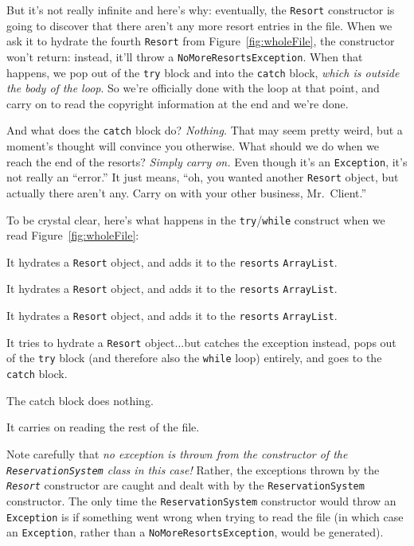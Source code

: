 But it's not really infinite and here's why: eventually, the \texttt{Resort}
constructor is going to discover that there aren't any more resort entries in
the file. When we ask it to hydrate the fourth \texttt{Resort} from
Figure~\ref{fig:wholeFile}, the constructor won't return: instead, it'll throw
a \texttt{NoMoreResortsException}. When that happens, we pop out of the
\texttt{try} block and into the \texttt{catch} block, \textit{which is outside
the body of the loop}. So we're officially done with the loop at that point,
and carry on to read the copyright information at the end and we're done.

And what does the \texttt{catch} block do? \textit{Nothing.} That may seem
pretty weird, but a moment's thought will convince you otherwise. What should
we do when we reach the end of the resorts? \textit{Simply carry on.} Even
though it's an \texttt{Exception}, it's not really an ``error.'' It just
means, ``oh, you wanted another \texttt{Resort} object, but actually there
aren't any. Carry on with your other business, Mr.~Client.''

To be crystal clear, here's what happens in the \texttt{try}/\texttt{while}
construct when we read Figure~\ref{fig:wholeFile}:

\begin{compactenum}
\item It hydrates a \texttt{Resort} object, and adds it to the
\texttt{resorts} \texttt{ArrayList}.
\item It hydrates a \texttt{Resort} object, and adds it to the
\texttt{resorts} \texttt{ArrayList}.
\item It hydrates a \texttt{Resort} object, and adds it to the
\texttt{resorts} \texttt{ArrayList}.
\item It tries to hydrate a \texttt{Resort} object...but catches the exception
instead, pops out of the \texttt{try} block (and therefore also the
\texttt{while} loop) entirely, and goes to the \texttt{catch} block.
\item The catch block does nothing.
\item It carries on reading the rest of the file.
\end{compactenum}

Note carefully that \textit{no exception is thrown from the constructor of the
\texttt{ReservationSystem} class in this case!} Rather, the exceptions
thrown by the \textit{\texttt{Resort}} constructor are caught and dealt with
by the \texttt{ReservationSystem} constructor. The only time the
\texttt{ReservationSystem} constructor would throw an \texttt{Exception} is if
something went wrong when trying to read the file (in which case an
\texttt{Exception}, rather than a \texttt{NoMoreResortsException}, would be
generated).

